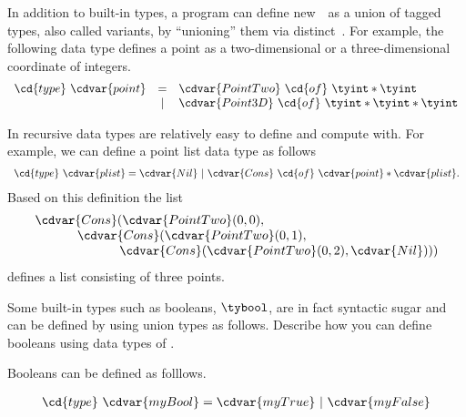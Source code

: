 \begin{gram}
In addition to built-in types, a program can define new~~as a
union of tagged types, also called variants, by ``unioning'' them via
distinct~.
%
For example, the following data type defines a point as a
two-dimensional or a three-dimensional coordinate of integers.
%
%
\[
\begin{array}{lcl}
\cd{type}~\cdvar{point} & = & \cdvar{PointTwo}~\cd{of}~\tyint * \tyint
\\
           & | & \cdvar{Point3D}~\cd{of}~\tyint * \tyint * \tyint
\end{array} 
\]
\end{gram}

\begin{gram}
In \pml recursive data types are relatively easy to define and compute
with. For example, we can define a point list data type as follows
%
\[
\begin{array}{l}
\cd{type}~\cdvar{plist} = \cdvar{Nil}~|~\cdvar{Cons}~\cd{of}~\cdvar{point} * \cdvar{plist}.
\end{array}
\] 
%
Based on this definition the list 
%
\[
\begin{array}{l}
\cdvar{Cons}(\cdvar{PointTwo} (0,0),  
\\
~~~~~~~~~~\cdvar{Cons}(\cdvar{PointTwo} (0,1), 
\\
~~~~~~~~~~~~~~~~~~~~\cdvar{Cons}(\cdvar{PointTwo}(0,2), \cdvar{Nil})))  
\end{array} 
\]
%
defines a list consisting of three points.
\end{gram}

\begin{flex}
\begin{exercise}[Booleans]
Some built-in types such as booleans, $\tybool$, are in fact syntactic
sugar and can be defined by using union types as follows.
%
Describe how you can define booleans using data types of \pml{}.
\end{exercise}

\begin{solution}
Booleans can be defined as folllows.

\[
\begin{array}{l}
\cd{type}~\cdvar{myBool} = \cdvar{myTrue}~|~\cdvar{myFalse} 
\end{array}
\] 
%
\end{solution}
\end{flex}


